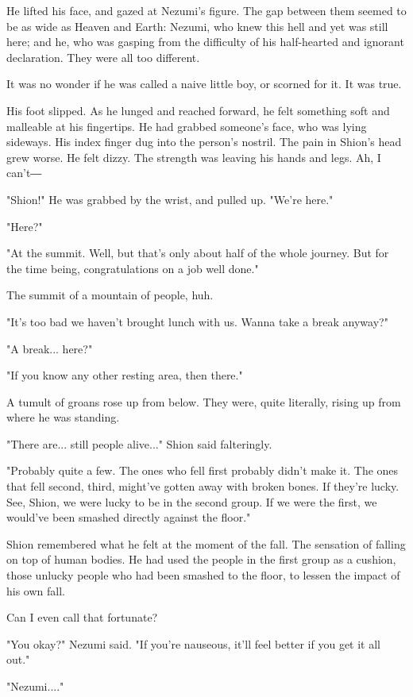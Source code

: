 He lifted his face, and gazed at Nezumi's figure. The gap between them
seemed to be as wide as Heaven and Earth: Nezumi, who knew this hell and
yet was still here; and he, who was gasping from the difficulty of his
half-hearted and ignorant declaration. They were all too different.

It was no wonder if he was called a naive little boy, or scorned for it.
It was true.

His foot slipped. As he lunged and reached forward, he felt something
soft and malleable at his fingertips. He had grabbed someone's face, who
was lying sideways. His index finger dug into the person's nostril. The
pain in Shion's head grew worse. He felt dizzy. The strength was leaving
his hands and legs. Ah, I can't―

"Shion!" He was grabbed by the wrist, and pulled up. "We're here."

"Here?"

"At the summit. Well, but that's only about half of the whole journey.
But for the time being, congratulations on a job well done."

The summit of a mountain of people, huh.

"It's too bad we haven't brought lunch with us. Wanna take a break
anyway?"

"A break... here?"

"If you know any other resting area, then there."

A tumult of groans rose up from below. They were, quite literally,
rising up from where he was standing.

"There are... still people alive..." Shion said falteringly.

"Probably quite a few. The ones who fell first probably didn't make it.
The ones that fell second, third, might've gotten away with broken
bones. If they're lucky. See, Shion, we were lucky to be in the second
group. If we were the first, we would've been smashed directly against
the floor."

Shion remembered what he felt at the moment of the fall. The sensation
of falling on top of human bodies. He had used the people in the first
group as a cushion, those unlucky people who had been smashed to the
floor, to lessen the impact of his own fall.

Can I even call that fortunate?

"You okay?" Nezumi said. "If you're nauseous, it'll feel better if you
get it all out."

"Nezumi...."

